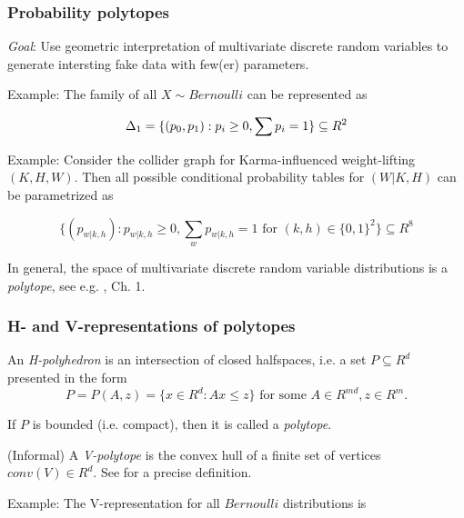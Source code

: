\begin{frame}
\frametitle{Probability polytopes}

\emph{Goal}: Use geometric interpretation of multivariate discrete random variables to generate intersting fake data with few(er) parameters.\newline

Example: The family of all $X \sim Bernoulli$ can be represented as

\begin{equation*}
\Delta_1 = \{(p_0, p_1): p_i \geq 0, \sum p_i = 1\} \subseteq R^2\newline
\end{equation*}

Example: Consider the collider graph for Karma-influenced weight-lifting $(K, H, W)$. Then all possible conditional probability tables for $(W | K, H)$ can be parametrized as 

\begin{equation*}
  \{(p_{w | k, h}): p_{w | k, h} \geq 0, \sum_w p_{w  | k,h} = 1 \textrm{ for } (k, h) \in \{0, 1\}^2\} \subseteq R^8
\end{equation*}

In general, the space of multivariate discrete random variable distributions is a \emph{polytope}, see e.g. \cite{drton2008lectures}, Ch. 1.
\end{frame}


\begin{frame}
\frametitle{H- and V-representations of polytopes}

\begin{definition}
An \emph{H-polyhedron} is an intersection of closed halfspaces, i.e. a set $P \subseteq R^d$ presented in the form
\begin{equation*}
P = P(A,z)=\{ x \in R^d: Ax \leq z\} \textrm{ for some } A \in R^{m d}, z \in R^m.
\end{equation*}
\end{definition}

If $P$ is bounded (i.e. compact), then it is called a \emph{polytope}.

\begin{definition}
(Informal) A \emph{V-polytope} is the convex hull of a finite set of vertices $conv(V) \in R^d$. See \cite{ziegler2012lectures} for a precise definition.
\end{definition}

Example: The V-representation for all $Bernoulli$ distributions is
\end{frame}


